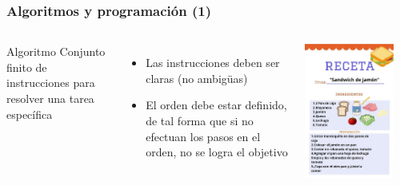 
\begin{frame}[fragile]
\frametitle{Algoritmos y programaci\'on (1)}
\begin{columns}

\begin{block}{Algoritmo}
Conjunto finito de instrucciones para resolver una tarea espec\'ifica \pause
\end{block}

\begin{itemize}
\item Las instrucciones deben ser claras (no ambig\"uas) \pause
\item El orden debe estar definido, de tal forma que si no efectuan los pasos en el orden, no se logra el objetivo \pause
\end{itemize}

 
\begin{center}
\includegraphics[width=0.85\textwidth]{Figs/receta_sandwidch.jpg}
\end{center} 
\end{columns}

\end{frame}

